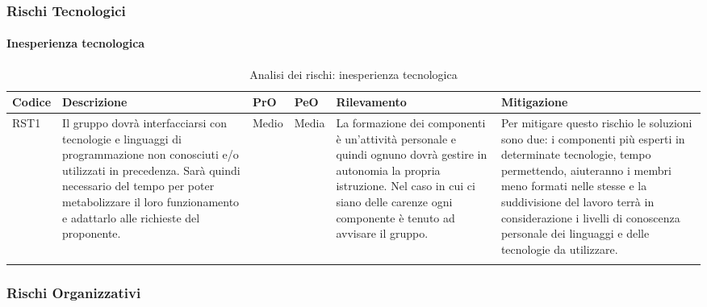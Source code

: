 \subsubsection{Rischi Tecnologici}
\paragraph{Inesperienza tecnologica}		
		\begin{center}
	\begin{longtable}{p{1cm}|p{4cm}|p{0.7cm}|p{0.7cm}|p{3cm}|p{4cm}}
		\arrayrulecolor{white}
		\hline
		\rowcolor{blue!20}
		\textbf{Codice} & 
		\textbf{Descrizione} &
		\textbf{PrO}  &
		\textbf{PeO}  &				        
		\textbf{Rilevamento} &
		\textbf{Mitigazione} \\
		\hline
		RST1 & Il gruppo dovrà interfacciarsi con tecnologie e linguaggi di programmazione non conosciuti e/o utilizzati in precedenza. Sarà quindi necessario del tempo per poter metabolizzare il loro funzionamento e adattarlo alle richieste del proponente. & Medio & Media & La formazione dei componenti è un'attività personale e quindi ognuno dovrà gestire in autonomia la propria istruzione. Nel caso in cui ci siano delle carenze ogni componente è tenuto ad avvisare il gruppo. & Per mitigare questo rischio le soluzioni sono due: i componenti più esperti in determinate tecnologie, tempo permettendo, aiuteranno i membri meno formati nelle stesse e la suddivisione del lavoro terrà in considerazione i livelli di conoscenza personale dei linguaggi e delle tecnologie da utilizzare. \\
		
		\rowcolor{white}
		\caption{Analisi dei rischi: inesperienza tecnologica}
	\end{longtable}
\end{center}		
		
\subsubsection{Rischi Organizzativi}
